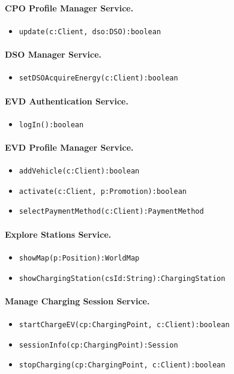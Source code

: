\paragraph{CPO Profile Manager Service.}
\begin{itemize}
    \item \verb|update(c:Client, dso:DSO):boolean|
\end{itemize}

\paragraph{DSO Manager Service.}
\begin{itemize}
    \item \verb|setDSOAcquireEnergy(c:Client):boolean|
\end{itemize}

\paragraph{EVD Authentication Service.}
\begin{itemize}
    \item \verb|logIn():boolean|
\end{itemize}

\paragraph{EVD Profile Manager Service.}
\begin{itemize}
    \item \verb|addVehicle(c:Client):boolean|
    \item \verb|activate(c:Client, p:Promotion):boolean|
    \item \verb|selectPaymentMethod(c:Client):PaymentMethod|
\end{itemize}

\paragraph{Explore Stations Service.}
\begin{itemize}
    \item \verb|showMap(p:Position):WorldMap|
    \item \verb|showChargingStation(csId:String):ChargingStation|
\end{itemize}

\paragraph{Manage Charging Session Service.}
\begin{itemize}
    \item \verb|startChargeEV(cp:ChargingPoint, c:Client):boolean|
    \item \verb|sessionInfo(cp:ChargingPoint):Session|
    \item \verb|stopCharging(cp:ChargingPoint, c:Client):boolean|
\end{itemize}

